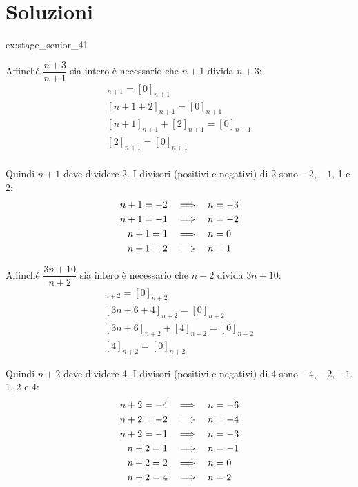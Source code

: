 \chapter{Soluzioni}
\label{ch:soluzioni}


\begin{soluzione}{ex:stage_senior_41}

    Affinché $\dfrac{n + 3}{n + 1}$ sia intero è necessario che $n+1$ divida $n+3$:
    \begin{gather*}
        [n + 3]_{n + 1} = [0]_{n+1} \\
        [n + 1 + 2]_{n + 1} = [0]_{n+1} \\
        [n + 1]_{n+1} + [2]_{n + 1} = [0]_{n+1} \\
        [2]_{n + 1} = [0]_{n+1} \\
    \end{gather*}

    Quindi $n+1$ deve dividere 2.
    I divisori (positivi e negativi) di 2 sono $-2$, $-1$, 1 e 2:
    \begin{align*}
        n + 1 = -2 & \quad\Longrightarrow\quad  n = -3 \\
        n + 1 = -1 & \quad\Longrightarrow\quad  n = -2 \\
        n + 1 = 1 & \quad\Longrightarrow\quad  n = 0 \\
        n + 1 = 2 & \quad\Longrightarrow\quad  n = 1
    \end{align*}

    Affinché $\dfrac{3n + 10}{n + 2}$ sia intero è necessario che $n+2$ divida $3n+10$:
    \begin{gather*}
        [3n+10]_{n+2} = [0]_{n+2} \\
        [3n + 6 + 4]_{n+2} = [0]_{n+2} \\
        [3n + 6]_{n+2} + [4]_{n+2} = [0]_{n+2} \\
        [4]_{n+2} = [0]_{n+2}
    \end{gather*}

    Quindi $n+2$ deve dividere 4.
    I divisori (positivi e negativi) di 4 sono $-4$, $-2$, $-1$, 1, 2 e 4:
    \begin{align*}
        n+2 = -4 & \quad\Longrightarrow\quad  n = -6 \\
        n+2 = -2 & \quad\Longrightarrow\quad  n = -4 \\
        n+2 = -1 & \quad\Longrightarrow\quad  n = -3 \\
        n+2 = 1 & \quad\Longrightarrow\quad  n = -1 \\
        n+2 = 2 & \quad\Longrightarrow\quad  n = 0 \\
        n+2 = 4 & \quad\Longrightarrow\quad  n = 2
    \end{align*}


\end{soluzione}
